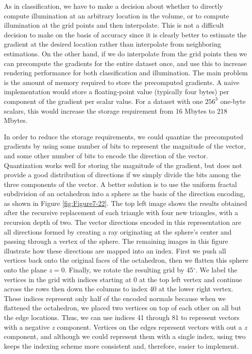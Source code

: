 As in classification, we have to make a decision about whether to directly compute illumination at an arbitrary location in the volume, or to compute illumination at the grid points and then interpolate. This is not a difficult decision to make on the basis of accuracy since it is clearly better to estimate the gradient at the desired location rather than interpolate from neighboring estimations. On the other hand, if we do interpolate from the grid points then we can precompute the gradients for the entire dataset once, and use this to increase rendering performance for both classification and illumination. The main problem is the amount of memory required to store the precomputed gradients. A naive implementation would store a floating-point value (typically four bytes) per component of the gradient per scalar value. For a dataset with one $256^3$ one-byte scalars, this would increase the storage requirement from 16 Mbytes to 218 Mbytes.

In order to reduce the storage requirements, we could quantize the precomputed gradients by using some number of bits to represent the magnitude of the vector, and some other number of bits to encode the direction of the vector. Quantization works well for storing the magnitude of the gradient, but does not provide a good distribution of directions if we simply divide the bits among the three components of the vector. A better solution is to use the uniform fractal subdivision of an  octahedron into a sphere as the basis of the direction encoding, as shown in Figure \ref{fig:Figure7-22}. The top left image shows the results obtained after the recursive replacement of each triangle with four new triangles, with a recursion depth of two. The vector directions encoded in this representation are all directions formed by creating a ray originating at the sphere's center and passing through a vertex of the sphere. The remaining images in this figure illustrate how these directions are mapped into an index. First we push all vertices back onto the original faces of the octahedron, then we flatten this sphere onto the plane $z=0$. Finally, we rotate the resulting grid by 45$^\circ$. We label the vertices in the grid with indices starting at 0 at the top left vertex and continue across the rows then down the columns to index 40 at the lower right vertex. These indices represent only half of the encoded normals because when we flattened the octahedron, we placed two vertices on top of each other on all but the edge locations. Thus, we can use indices 41 through 81 to represent vectors with a negative \emph{z} component. Vertices on the edges represent vectors with out a \emph{z} component, and although we could represent them with a single index, using two keeps the indexing scheme more consistent and, therefore, easier to implement.

